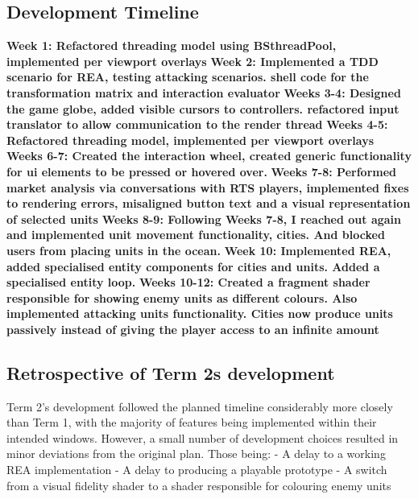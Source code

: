 \documentclass[]{final_report}
\begin{document}
\subsection{Development Timeline}
\textbf{Week 1: Refactored threading model using BSthreadPool, implemented per viewport overlays} \newline
\textbf{Week 2: Implemented a TDD scenario for REA, testing attacking scenarios. shell code for the transformation matrix and interaction evaluator} \newline
\textbf{Weeks 3-4: Designed the game globe, added visible cursors to controllers. refactored input translator to allow communication to the render thread} \newline
\textbf{Weeks 4-5: Refactored threading model, implemented per viewport overlays} \newline
\textbf{Weeks 6-7: Created the interaction wheel, created generic functionality for ui elements to be pressed or hovered over.} \newline
\textbf{Weeks 7-8: Performed market analysis via conversations with RTS players, implemented fixes to rendering errors, misaligned button text and a visual representation of selected units} \newline
\textbf{Weeks 8-9: Following Weeks 7-8, I reached out again and implemented unit movement functionality, cities. And blocked users from placing units in the ocean.} \newline
\textbf{Week 10: Implemented REA, added specialised entity components for cities and units. Added a specialised entity loop. } \newline
\textbf{Weeks 10-12: Created a fragment shader responsible for showing enemy units as different colours. Also implemented attacking units functionality. Cities now produce units passively instead of giving the player access to an infinite amount} \newline

\subsection{Retrospective of Term 2s development}
Term 2's development followed the planned timeline considerably more closely than Term 1, with the majority of features being implemented within their intended windows. However, a small number of development choices resulted in minor deviations from the original plan. Those being: \newline
- A delay to a working REA implementation \newline
- A delay to producing a playable prototype \newline
- A switch from a visual fidelity shader to a shader responsible for colouring enemy units \newline
\end{document}
